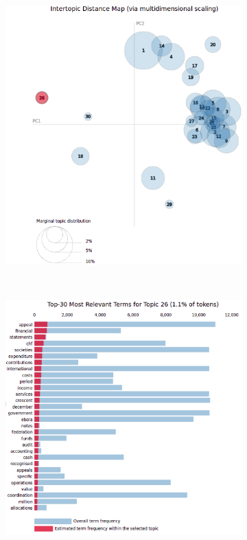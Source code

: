 \begin{figure}[h!]
    \centering
    \begin{subfigure}[h]{0.60\textwidth}
        \includegraphics[width=\textwidth]{c4_5_orig.png}
        \label{fig:trapez1}
    \end{subfigure}
    ~ %
    \begin{subfigure}[h]{0.60\textwidth}
        \includegraphics[width=\textwidth]{c4_6_orig.png}

\end{subfigure}
\end{figure}
